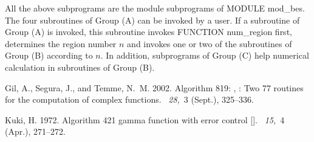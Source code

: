 \documentclass[acmtoms]{acmtrans2m}
\begin{document}
All the above subprograms are the module subprograms of MODULE mod\_bes. 
The four subroutines of Group (A) can be invoked by a user. 
If a subroutine of Group (A) is invoked, this 
subroutine invokes FUNCTION num\_region first, determines the region number 
$n$ and invokes one or two of the subroutines of Group (B) 
according to $n$.
In addition, subprograms of Group (C) help numerical calculation in 
subroutines of Group (B).

%
\begin{thebibliography}{}

{\sc Gil, A.}, {\sc Segura, J.}, {\sc and} {\sc Temme, N.~M.} 2002.
\newblock Algorithm 819: , : Two  77
  routines for the computation of complex  functions.
~{\em 28,\/}~3 (Sept.), 325--336.

{\sc Kuki, H.} 1972.
\newblock Algorithm 421\quad {} gamma function with error
  control [].
~{\em 15,\/}~4 (Apr.), 271--272.

\end{thebibliography}
\end{document}
